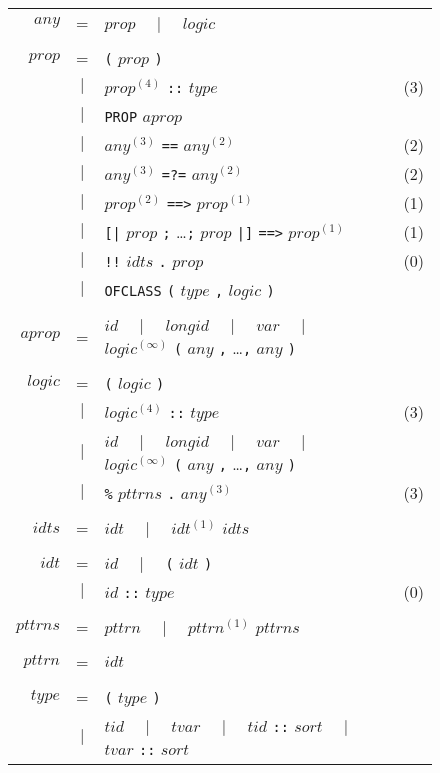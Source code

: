 \begin{figure}\small
\begin{center}
\begin{tabular}{rclc}
$any$ &=& $prop$ ~~$|$~~ $logic$ \\\\
$prop$ &=& {\tt(} $prop$ {\tt)} \\
     &$|$& $prop^{(4)}$ {\tt::} $type$ & (3) \\
     &$|$& {\tt PROP} $aprop$ \\
     &$|$& $any^{(3)}$ {\tt ==} $any^{(2)}$ & (2) \\
     &$|$& $any^{(3)}$ {\tt =?=} $any^{(2)}$ & (2) \\
     &$|$& $prop^{(2)}$ {\tt ==>} $prop^{(1)}$ & (1) \\
     &$|$& {\tt[|} $prop$ {\tt;} \dots {\tt;} $prop$ {\tt|]} {\tt==>} $prop^{(1)}$ & (1) \\
     &$|$& {\tt!!} $idts$ {\tt.} $prop$ & (0) \\
     &$|$& {\tt OFCLASS} {\tt(} $type$ {\tt,} $logic$ {\tt)} \\\\
$aprop$ &=& $id$ ~~$|$~~ $longid$ ~~$|$~~ $var$
    ~~$|$~~ $logic^{(\infty)}$ {\tt(} $any$ {\tt,} \dots {\tt,} $any$ {\tt)} \\\\
$logic$ &=& {\tt(} $logic$ {\tt)} \\
      &$|$& $logic^{(4)}$ {\tt::} $type$ & (3) \\
      &$|$& $id$ ~~$|$~~ $longid$ ~~$|$~~ $var$
    ~~$|$~~ $logic^{(\infty)}$ {\tt(} $any$ {\tt,} \dots {\tt,} $any$ {\tt)} \\
      &$|$& {\tt \%} $pttrns$ {\tt.} $any^{(3)}$ & (3) \\\\
$idts$ &=& $idt$ ~~$|$~~ $idt^{(1)}$ $idts$ \\\\
$idt$ &=& $id$ ~~$|$~~ {\tt(} $idt$ {\tt)} \\
    &$|$& $id$ {\tt ::} $type$ & (0) \\\\
$pttrns$ &=& $pttrn$ ~~$|$~~ $pttrn^{(1)}$ $pttrns$ \\\\
$pttrn$ &=& $idt$ \\\\
$type$ &=& {\tt(} $type$ {\tt)} \\
     &$|$& $tid$ ~~$|$~~ $tvar$ ~~$|$~~ $tid$ {\tt::} $sort$
       ~~$|$~~ $tvar$ {\tt::} $sort$ \\

\end{tabular}
\end{center}
\end{figure}
